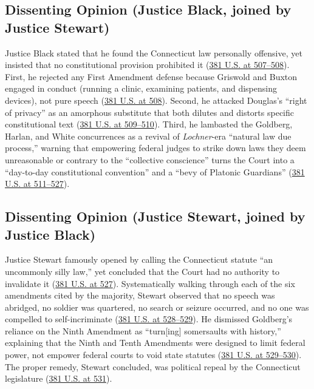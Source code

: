 \documentclass[12pt]{article}
\begin{document}
\subsection{Dissenting Opinion (Justice Black, joined by Justice Stewart)}
Justice Black stated that he found the Connecticut law personally offensive, yet insisted that no constitutional provision prohibited it (\href{https://supreme.justia.com/cases/federal/us/381/479/}{381 U.S. at 507--508}). First, he rejected any First Amendment defense because Griswold and Buxton engaged in conduct (running a clinic, examining patients, and dispensing devices), not pure speech (\href{https://supreme.justia.com/cases/federal/us/381/479/}{381 U.S. at 508}). Second, he attacked Douglas's ``right of privacy'' as an amorphous substitute that both dilutes and distorts specific constitutional text (\href{https://supreme.justia.com/cases/federal/us/381/479/}{381 U.S. at 509--510}). Third, he lambasted the Goldberg, Harlan, and White concurrences as a revival of \textit{Lochner}-era ``natural law due process,'' warning that empowering federal judges to strike down laws they deem unreasonable or contrary to the ``collective conscience'' turns the Court into a ``day-to-day constitutional convention'' and a ``bevy of Platonic Guardians'' (\href{https://supreme.justia.com/cases/federal/us/381/479/}{381 U.S. at 511--527}).

\subsection{Dissenting Opinion (Justice Stewart, joined by Justice Black)}
Justice Stewart famously opened by calling the Connecticut statute ``an uncommonly silly law,'' yet concluded that the Court had no authority to invalidate it (\href{https://supreme.justia.com/cases/federal/us/381/479/}{381 U.S. at 527}). Systematically walking through each of the six amendments cited by the majority, Stewart observed that no speech was abridged, no soldier was quartered, no search or seizure occurred, and no one was compelled to self-incriminate (\href{https://supreme.justia.com/cases/federal/us/381/479/}{381 U.S. at 528--529}). He dismissed Goldberg's reliance on the Ninth Amendment as ``turn[ing] somersaults with history,'' explaining that the Ninth and Tenth Amendments were designed to limit federal power, not empower federal courts to void state statutes (\href{https://supreme.justia.com/cases/federal/us/381/479/}{381 U.S. at 529--530}). The proper remedy, Stewart concluded, was political repeal by the Connecticut legislature (\href{https://supreme.justia.com/cases/federal/us/381/479/}{381 U.S. at 531}).
\end{document}
